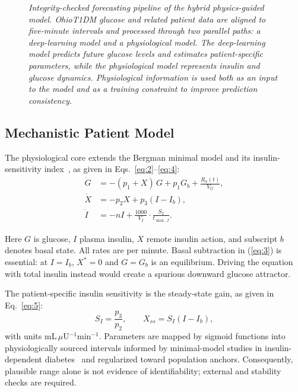 \documentclass[journal]{IEEEtran}
\begin{document}
\begin{figure}[p]
\begin{tikzpicture}
\end{tikzpicture}

\caption{\small\textit{Integrity-checked forecasting pipeline of the hybrid physics-guided model. OhioT1DM glucose and related patient data are aligned to five-minute intervals and processed through two parallel paths: a deep-learning model and a physiological model. The deep-learning model predicts future glucose levels and estimates patient-specific parameters, while the physiological model represents insulin and glucose dynamics. Physiological information is used both as an input to the model and as a training constraint to improve prediction consistency.
}}
\label{fig:pipeline}
\end{figure}

\subsection{Mechanistic Patient Model}

The physiological core extends the Bergman minimal model and its insulin-sensitivity index~\cite{ref1,ref32}, as given in Eqs.~\eqref{eq:2}--\eqref{eq:4}:
\begin{align}
\dot{G} &= -(p_1 + X)\,G + p_1 G_b + \frac{R_a(t)}{V_G}, \label{eq:2}\\
\dot{X} &= -p_2 X + p_3 (I - I_b), \label{eq:3}\\
\dot{I} &= -nI + \frac{1000}{V_I}\cdot\frac{S_2}{t_{\max,I}}. \label{eq:4}
\end{align}

Here $G$ is glucose, $I$ plasma insulin, $X$ remote insulin action, and subscript $b$ denotes basal state. All rates are per minute. Basal subtraction in (\ref{eq:3}) is essential: at $I = I_b$, $X^* = 0$ and $G = G_b$ is an equilibrium. Driving the equation with total insulin instead would create a spurious downward glucose attractor.

The patient-specific insulin sensitivity is the steady-state gain, as given in Eq.~\eqref{eq:5}:
\begin{equation}
S_I = \frac{p_3}{p_2}, \qquad X_{ss} = S_I (I - I_b),
\label{eq:5}
\end{equation}
with units mL\,$\mu$U$^{-1}$min$^{-1}$. Parameters are mapped by sigmoid functions into physiologically sourced intervals informed by minimal-model studies in insulin-dependent diabetes~\cite{ref33} and regularized toward population anchors. Consequently, plausible range alone is not evidence of identifiability; external and stability checks are required.
\end{document}

